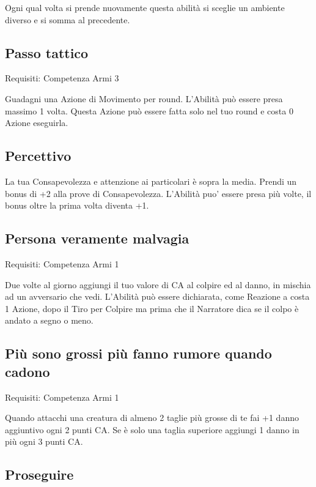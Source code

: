 \documentclass[a4paper,11pt,twoside,openany]{book}
\begin{document}
\bigskip

Ogni qual volta si prende nuovamente questa abilità si sceglie un
ambiente diverso e si somma al precedente.

\subsection{Passo tattico}

Requisiti: Competenza Armi 3

Guadagni una Azione di Movimento per round. L'Abilità può essere presa massimo 1 volta. Questa Azione può essere fatta solo nel tuo round e costa 0 Azione eseguirla.

\subsection{Percettivo}

La tua Consapevolezza e attenzione ai particolari è sopra la media.
Prendi un bonus di +2 alla prove di Consapevolezza. L'Abilità puo'
essere presa più volte, il bonus oltre la prima volta diventa +1.

\subsection{Persona veramente malvagia}

Requisiti: Competenza Armi 1

Due volte al giorno aggiungi il tuo valore di CA al colpire ed al danno, in mischia ad un avversario che vedi. L'Abilità può essere dichiarata, come Reazione a costa 1 Azione, dopo il Tiro per Colpire ma prima che il Narratore dica se il colpo è andato a segno o meno.

\subsection{Più sono grossi più fanno rumore quando cadono}

Requisiti: Competenza Armi 1

Quando attacchi una creatura di almeno 2 taglie più grosse di te fai +1 danno aggiuntivo ogni 2 punti CA. Se è solo una taglia superiore aggiungi 1 danno in più ogni 3 punti CA.

\subsection{Proseguire}
\end{document}
